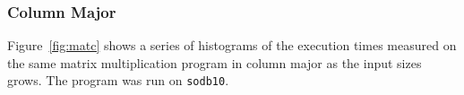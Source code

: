 \documentclass[10pt]{article}
\begin{document}
\pagebreak

\subsubsection{Column Major}

Figure~\ref{fig:matc} shows a series of 
histograms of the execution times measured on 
the same matrix multiplication program in column major 
as the input sizes grows. The program was run on {\tt sodb10}.

%
%
\end{document}
